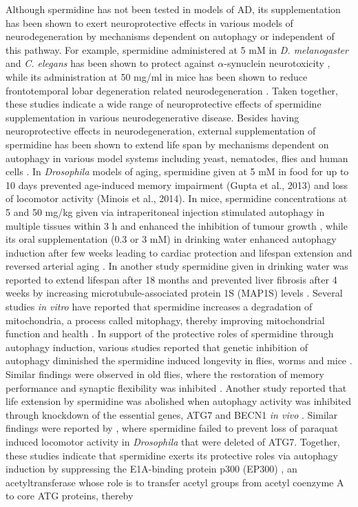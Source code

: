 Although spermidine has not been tested in models of AD, its supplementation has been shown to exert neuroprotective effects in various models of neurodegeneration  by mechanisms dependent on autophagy or independent of this pathway. For example, spermidine administered at 5 mM in \textit{D. melanogaster}  and \textit{C. elegans} has been shown to protect against $\alpha$-synuclein neurotoxicity \citep{Buttner2014}, while its administration at  50 mg/ml in mice has been shown to reduce frontotemporal lobar degeneration related neurodegeneration \citep{Wang2012}. Taken together, these studies indicate a wide range of neuroprotective effects of spermidine supplementation in various neurodegenerative disease. Besides having neuroprotective effects in neurodegeneration, external supplementation of spermidine has been shown to extend life span by mechanisms dependent on autophagy in various model systems including yeast, nematodes, flies \citep{Eisenberg2009,Minois2012,Morselli2011} and human cells \citep{Eisenberg2009,Garcia-Prat2016,Morselli2011,Pietrocola2015}. In \textit{Drosophila} models of aging, spermidine given at 5 mM in food for up to 10 days prevented age-induced memory impairment (Gupta et al., 2013) and loss of locomotor activity (Minois et al., 2014). In mice, spermidine concentrations at 5 and 50 mg/kg given via intraperitoneal injection stimulated autophagy in multiple tissues within 3 h \citep{Morselli2011,Pucciarelli2012} and enhanced the inhibition of tumour growth \citep{Pietrocola2016}, while its oral supplementation (0.3 or  3 mM) in drinking water enhanced autophagy induction after few weeks leading to cardiac protection and lifespan extension \citep{Eisenberg2016a,Eisenberg2016b} and reversed arterial aging \citep{LaRocca2013}. In another study spermidine given in drinking water was reported to extend lifespan after 18 months and prevented liver fibrosis after 4 weeks by increasing microtubule-associated protein 1S (MAP1S) levels \citep{Yue2017}. Several studies \textit{in vitro} have reported that spermidine increases a degradation of mitochondria, a process called mitophagy, thereby improving mitochondrial function and health \citep{Eisenberg2016a,Eisenberg2016b,Fan2017,Garcia-Prat2016,Qi2016}. In support of the protective roles of spermidine through autophagy induction, various studies reported that genetic inhibition of autophagy diminished the spermidine induced longevity in flies, worms \citep{Eisenberg2009} and mice \citep{Yue2017}. Similar findings were observed in old flies, where the restoration of memory performance and synaptic flexibility was inhibited \citep{Gupta2013,Gupta2016}. Another study reported that life extension by spermidine was abolished when autophagy activity was inhibited through knockdown of the essential genes, ATG7 and BECN1 \textit{in vivo} \citep{He2013}. Similar findings were reported by \citet{Minois2012}, where spermidine failed to prevent loss of paraquat induced locomotor activity in \textit{Drosophila} that were deleted of ATG7. Together, these studies indicate that spermidine exerts its protective roles via autophagy induction by suppressing the E1A-binding protein p300 (EP300) \citep{Pietrocola2015}, an acetyltransferase whose role is to transfer acetyl groups from acetyl coenzyme A to core ATG proteins, thereby 